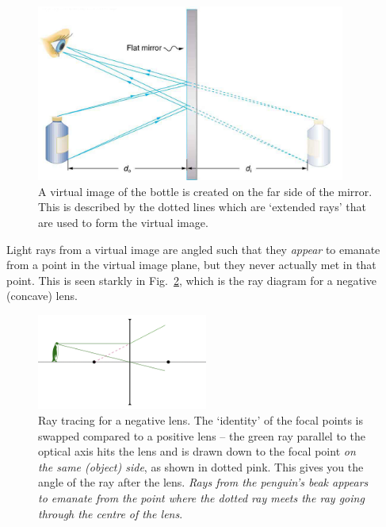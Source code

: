 \documentclass[a4paper]{report}
\begin{document}
    \begin{figure}[h]
    \center
    \includegraphics[width=4in]{figures/virtual_image_mirr.jpg}
    \caption{A virtual image of the bottle is created on the far side of the mirror.
    This is described by the dotted lines which are `extended rays' that are used to form the virtual image. }
    \label{fig:mirror}
    \end{figure}

    \clearpage

    Light rays from a virtual image are angled such that they \emph{appear} to emanate from a point in the virtual image plane, but they never actually met in that point.
    This is seen starkly in Fig.~\ref{fig:negative_lens_tracing}, which is the ray diagram for a negative (concave) lens.

    \begin{figure}[h]
		\center
		\includegraphics[width=0.5\textwidth]{figures/negative_lens_tracing.png}
		\captionsetup{width=0.6\textwidth}
		\caption{Ray tracing for a negative lens. The `identity' of the focal points is swapped compared to a positive lens -- the green ray parallel to the optical axis hits the lens and is drawn down to the focal point \emph{on the same (object) side}, as shown in dotted pink. This gives you the angle of the ray after the lens. \emph{Rays from the penguin's beak appears to emanate from the point where the dotted ray meets the ray going through the centre of the lens}.
		}
		\label{fig:negative_lens_tracing}
	\end{figure}
\end{document}
